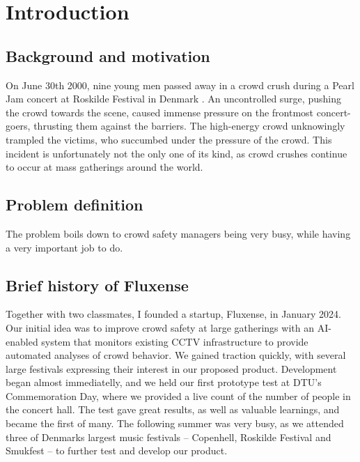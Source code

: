 \chapter{Introduction}

\section{Background and motivation}
On June 30th 2000, nine young men passed away in a crowd crush during a Pearl Jam concert at Roskilde Festival in Denmark \cite{pearl_jam}. An uncontrolled surge, pushing the crowd towards the scene, caused immense pressure on the frontmost concert-goers, thrusting them against the barriers. The high-energy crowd unknowingly trampled the victims, who succumbed under the pressure of the crowd. This incident is unfortunately not the only one of its kind, as crowd crushes continue to occur at mass gatherings around the world.

\section{Problem definition}
\label{sec:problem-definition}

The problem boils down to crowd safety managers being very busy, while having a very important job to do.
\section{Brief history of Fluxense}

Together with two classmates, I founded a startup, Fluxense, in January 2024. Our initial idea was to improve crowd safety at large gatherings with an AI-enabled system that monitors existing CCTV infrastructure to provide automated analyses of crowd behavior. We gained traction quickly, with several large festivals expressing their interest in our proposed product. Development began almost immediatelly, and we held our first prototype test at DTU's Commemoration Day, where we provided a live count of the number of people in the concert hall. The test gave great results, as well as valuable learnings, and became the first of many. The following summer was very busy, as we attended three of Denmarks largest music festivals -- Copenhell, Roskilde Festival and Smukfest -- to further test and develop our product.


